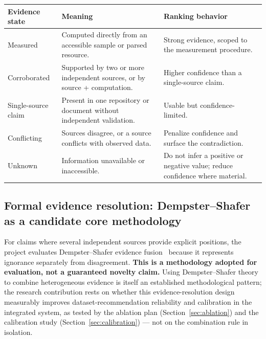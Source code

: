 \documentclass[11pt]{article}
\begin{document}
\begin{longtable}{@{}L{2.6cm}L{5.6cm}L{5.9cm}@{}}
\toprule
\textbf{Evidence state} & \textbf{Meaning} & \textbf{Ranking behavior} \\
\midrule
\endhead
Measured & Computed directly from an accessible sample or parsed resource. & Strong evidence, scoped to the
  measurement procedure. \\
Corroborated & Supported by two or more independent sources, or by source + computation. & Higher
  confidence than a single-source claim. \\
Single-source claim & Present in one repository or document without independent validation. & Usable but
  confidence-limited. \\
Conflicting & Sources disagree, or a source conflicts with observed data. & Penalize confidence and surface
  the contradiction. \\
Unknown & Information unavailable or inaccessible. & Do not infer a positive or negative value; reduce
  confidence where material. \\
\bottomrule
\end{longtable}

\subsection{Formal evidence resolution: Dempster--Shafer as a candidate core methodology}
\label{sec:resolver}
For claims where several independent sources provide explicit positions, the project evaluates
Dempster--Shafer evidence fusion~\cite{shafer1976,dempster1968} because it represents ignorance separately
from disagreement. \textbf{This is a methodology adopted for evaluation, not a guaranteed novelty claim.}
Using Dempster--Shafer theory to combine heterogeneous evidence is itself an established methodological
pattern; the research contribution rests on whether this evidence-resolution design measurably improves
dataset-recommendation reliability and calibration in the integrated system, as tested by the ablation plan
(Section~\ref{sec:ablation}) and the calibration study (Section~\ref{sec:calibration}) --- not on the
combination rule in isolation.
\end{document}
